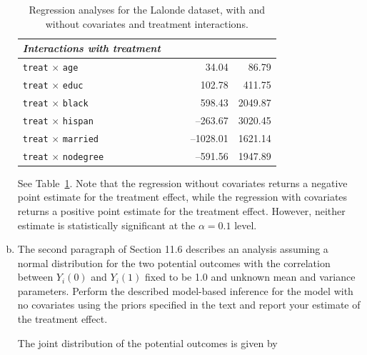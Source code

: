 \begin{enumerate}[(a)]
\begin{table}[]
\begin{tabular}{l|rr|rr}
      \textit{Interactions with treatment}               &        &                         &           &                         \\ \midrule
      \texttt{treat} $\times$ \texttt{age}               &        &                         & 34.04     & 86.79                   \\
      \texttt{treat} $\times$ \texttt{educ}              &        &                         & 102.78    & 411.75                  \\
      \texttt{treat} $\times$ \texttt{black}             &        &                         & 598.43    & 2049.87                 \\
      \texttt{treat} $\times$ \texttt{hispan}            &        &                         & --263.67  & 3020.45                 \\
      \texttt{treat} $\times$ \texttt{married}           &        &                         & --1028.01 & 1621.14                 \\
      \texttt{treat} $\times$ \texttt{nodegree}          &        &
                                                                                            & --591.56  & 1947.89                 \\ \bottomrule
    \end{tabular}
    \caption{\label{tab:reg-table} Regression analyses for the Lalonde
      dataset, with and without covariates and treatment
      interactions. }
  \end{table}
  See Table~\ref{tab:reg-table}.  Note that the regression without
  covariates returns a negative point estimate for the treatment
  effect, while the regression with covariates returns a positive
  point estimate for the treatment effect.  However, neither estimate
  is statistically significant at the $\alpha = 0.1$ level.  
\item
  \begin{quoting}
    The second paragraph of Section 11.6 describes an analysis
    assuming a normal distribution for the two potential outcomes with
    the correlation between $Y_i(0)$ and $Y_i(1)$ fixed to be 1.0 and
    unknown mean and variance parameters. Perform the described
    model-based inference for the model with no covariates using the
    priors specified in the text and report your estimate of the
    treatment effect.
  \end{quoting}
  The joint distribution of the potential outcomes is given by

\end{enumerate}

